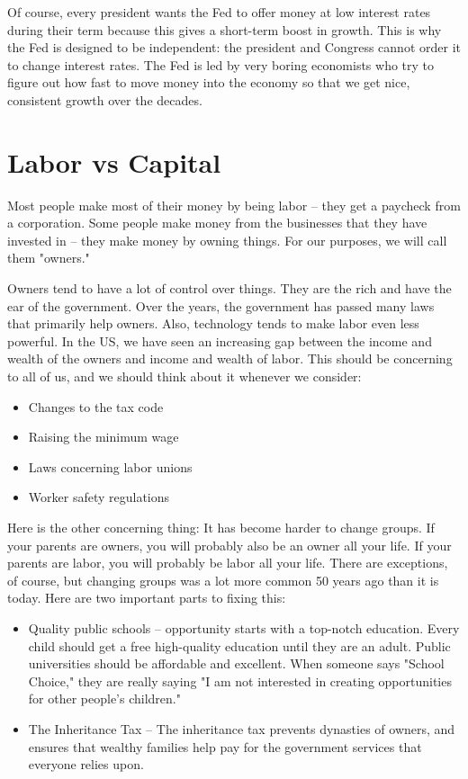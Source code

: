 Of course, every president wants the Fed to offer money at low interest rates during their term because this gives a short-term boost in growth. This is why the Fed is designed to be independent: the president and
Congress cannot order it to change interest rates.  The Fed is led by very boring economists who try to figure out how fast to move money into the economy so that we get nice, consistent growth over the decades.

\section{Labor vs Capital}

Most people make most of their money by being labor -- they get a paycheck from a corporation.  Some people make money from the businesses that they have invested in -- they make money by owning things. For our purposes, we will call them "owners."

Owners tend to have a lot of control over things. They are the rich and have the ear of the government. Over the years, the government has passed many laws that primarily help owners. Also, technology tends to make labor even less powerful. In the US, we have seen an increasing gap between the income and wealth of the owners and income and wealth of labor. This should be concerning to all of us, and we should think about it whenever we consider:
\begin{itemize}
\item Changes to the tax code
\item Raising the minimum wage
\item Laws concerning labor unions
\item Worker safety regulations
\end{itemize}

Here is the other concerning thing: It has become harder to change groups.  If your parents are owners, you will probably also be an owner all your life.  If your parents are labor, you will probably be labor all your life.  There are exceptions, of course, but changing groups was a lot more common 50 years ago than it is today. Here are two important parts to fixing this:
\begin{itemize}
\item Quality public schools -- opportunity starts with a top-notch education. Every child should get a free high-quality education until they are an adult. Public universities should be affordable and excellent. When someone says "School Choice," they are really saying "I am not interested in creating opportunities for other people's children."
\item The Inheritance Tax -- The inheritance tax prevents dynasties of owners, and ensures that wealthy families help pay for the government services that everyone relies upon.
\end{itemize}

